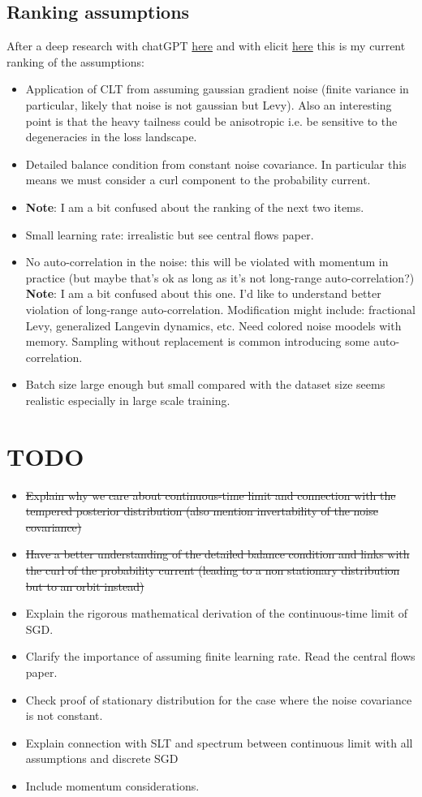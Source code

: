 \documentclass[11pt]{article}
\begin{document}
\subsection{Ranking assumptions}
After a deep research with chatGPT \href{https://chatgpt.com/s/dr_6853372e8bf48191913b0ad54514ca1b}{here} and with elicit \href{https://elicit.com/review/6aefb134-7070-4a9f-bb6d-6f86dff484ac}{here} this is my current ranking of the assumptions:
\begin{itemize}
    \item Application of CLT from assuming gaussian gradient noise (finite variance in particular, likely that noise is not gaussian but Levy). Also an interesting point is that the heavy tailness could be anisotropic i.e. be sensitive to the degeneracies in the loss landscape.
    \item Detailed balance condition from constant noise covariance. In particular this means we must consider a curl component to the probability current.
    \item \textbf{Note}: I am a bit confused about the ranking of the next two items.
    \item Small learning rate: irrealistic but see central flows paper.
    \item No auto-correlation in the noise: this will be violated with momentum in practice (but maybe that's ok as long as it's not long-range auto-correlation?) \textbf{Note}: I am a bit confused about this one. I'd like to understand better violation of long-range auto-correlation. Modification might include: fractional Levy, generalized Langevin dynamics, etc. Need colored noise moodels with memory. Sampling without replacement is common introducing some auto-correlation.
    \item Batch size large enough but small compared with the dataset size seems realistic especially in large scale training.
\end{itemize}
\section{\textbf{TODO}}
\begin{itemize}
    \item \sout{Explain why we care about continuous-time limit and connection with the tempered posterior distribution (also mention invertability of the noise covariance)}
    \item \sout{Have a better understanding of the detailed balance condition and links with the curl of the probability current (leading to a non stationary distribution but to an orbit instead)}
    \item Explain the rigorous mathematical derivation of the continuous-time limit of SGD.
    \item Clarify the importance of assuming finite learning rate. Read the central flows paper.
    \item Check proof of stationary distribution for the case where the noise covariance is not constant.
    \item Explain connection with SLT and spectrum between continuous limit with all assumptions and discrete SGD
    \item Include momentum considerations.
\end{itemize}
\end{document}
